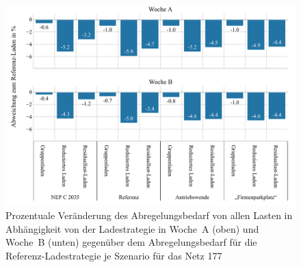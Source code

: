 \begin{figure}[H]
    \centering
    \includegraphics[width=\textwidth]{Bilder/177_cur_load_both_weeks}
    \caption{Prozentuale Veränderung des Abregelungsbedarf von allen Lasten in Abhängigkeit von der Ladestrategie in Woche~A (oben) und Woche~B (unten) gegenüber dem Abregelungsbedarf für die Referenz-Ladestrategie je Szenario für das Netz \num{177}}\label{fig:177_cur_load_both_weeks}
\end{figure}